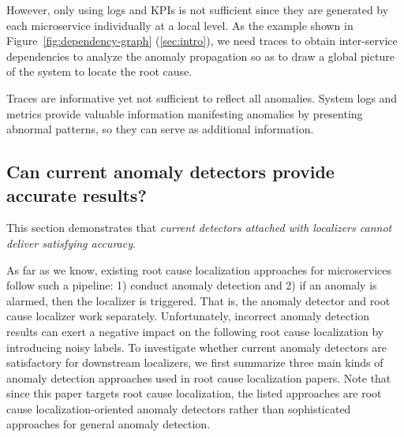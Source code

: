 However, only using logs and KPIs is not sufficient since they are generated by each microservice individually at a local level. As the example shown in Figure~\ref{fig:dependency-graph} (\cref{sec:intro}), we need traces to obtain inter-service dependencies to analyze the anomaly propagation so as to draw a global picture of the system to locate the root cause.

\begin{mybox}
    Traces are informative yet not sufficient to reflect all anomalies. System logs and metrics provide valuable information manifesting anomalies by presenting abnormal patterns, so they can serve as additional information. 
\end{mybox}

\subsection{Can current anomaly detectors provide accurate results?}\label{sec:study:detection}
This section demonstrates that \textit{current detectors attached with localizers cannot deliver satisfying accuracy}. 

As far as we know, existing root cause localization approaches for microservices follow such a pipeline: 1) conduct anomaly detection and 2) if an anomaly is alarmed, then the localizer is triggered. That is, the anomaly detector and root cause localizer work separately.
Unfortunately, incorrect anomaly detection  results can exert a negative impact on the following root cause localization by introducing noisy labels.
To investigate whether current anomaly detectors are satisfactory for downstream localizers, we first summarize three main kinds of anomaly detection  approaches used in root cause localization papers. Note that since this paper targets root cause localization, the listed approaches are root cause localization-oriented anomaly detectors rather than sophisticated approaches for general anomaly detection.

